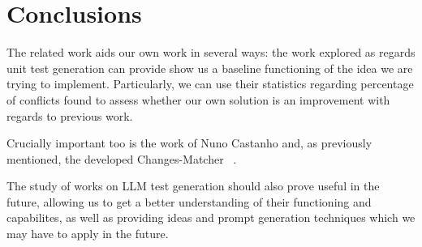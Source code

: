 \section{Conclusions}


The related work aids our own work in several ways: the work explored as regards unit test generation can provide show us a baseline functioning of the idea we are trying to implement. Particularly, we can use their statistics regarding percentage of conflicts found to assess whether our own solution is an improvement with regards to previous work.

Crucially important too is the work of Nuno Castanho and, as previously mentioned, the developed Changes-Matcher ~\citep{kn:nuno}.

The study of works on LLM test generation should also prove useful in the future, allowing us to get a better understanding of their functioning and capabilites, as well as providing ideas and prompt generation techniques which we may have to apply in the future.
